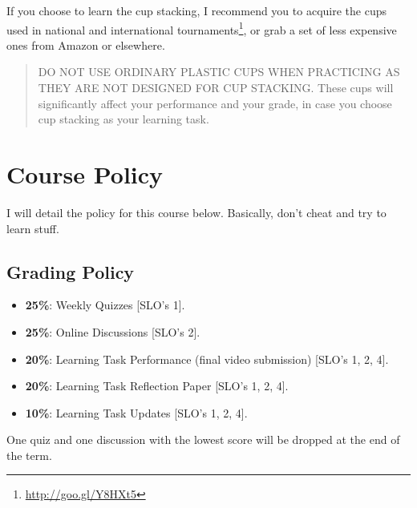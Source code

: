 \documentclass[
  letterpaper,
  DIV=11,
  numbers=noendperiod]{scrartcl}
\DeclareRobustCommand{\href}[2]{#2\footnote{\url{#1}}}
\begin{document}
If you choose to learn the cup stacking, I recommend you to acquire the
\href{http://goo.gl/Y8HXt5}{cups used in national and international
tournaments}, or grab a set of less expensive ones from Amazon or
elsewhere.

\begin{quote}
DO NOT USE ORDINARY PLASTIC CUPS WHEN PRACTICING AS THEY ARE NOT
DESIGNED FOR CUP STACKING. These cups will significantly affect your
performance and your grade, in case you choose cup stacking as your
learning task.
\end{quote}

\hypertarget{course-policy}{%
\section{Course Policy}\label{course-policy}}

I will detail the policy for this course below. Basically, don't cheat
and try to learn stuff.

\hypertarget{grading-policy}{%
\subsection{Grading Policy}\label{grading-policy}}

\begin{itemize}
\item
  \textbf{25\%}: Weekly Quizzes {[}SLO's 1{]}.
\item
  \textbf{25\%}: Online Discussions {[}SLO's 2{]}.
\item
  \textbf{20\%}: Learning Task Performance (final video submission)
  {[}SLO's 1, 2, 4{]}.
\item
  \textbf{20\%}: Learning Task Reflection Paper {[}SLO's 1, 2, 4{]}.
\item
  \textbf{10\%}: Learning Task Updates {[}SLO's 1, 2, 4{]}.
\end{itemize}

\begin{tcolorbox}[enhanced jigsaw, colbacktitle=quarto-callout-note-color!10!white, rightrule=.15mm, opacityback=0, colframe=quarto-callout-note-color-frame, leftrule=.75mm, breakable, bottomrule=.15mm, arc=.35mm, opacitybacktitle=0.6, title=\textcolor{quarto-callout-note-color}{\faInfo}\hspace{0.5em}{Note}, titlerule=0mm, toptitle=1mm, bottomtitle=1mm, left=2mm, toprule=.15mm, colback=white, coltitle=black]

One quiz and one discussion with the lowest score will be dropped at the
end of the term.

\end{tcolorbox}
\end{document}
